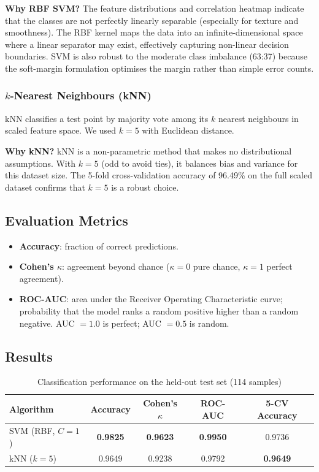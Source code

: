 \documentclass[12pt,a4paper]{article}
\begin{document}
\textbf{Why RBF SVM?}  The feature distributions and correlation heatmap indicate that
the classes are not perfectly linearly separable (especially for texture and smoothness).
The RBF kernel maps the data into an infinite-dimensional space where a linear
separator may exist, effectively capturing non-linear decision boundaries.  SVM is also
robust to the moderate class imbalance (63:37) because the soft-margin formulation
optimises the margin rather than simple error counts.

\subsubsection{$k$-Nearest Neighbours (kNN)}
kNN classifies a test point by majority vote among its $k$ nearest neighbours in
scaled feature space.  We used $k{=}5$ with Euclidean distance.

\textbf{Why kNN?}  kNN is a non-parametric method that makes no distributional
assumptions. With $k{=}5$ (odd to avoid ties), it balances bias and variance for
this dataset size.  The 5-fold cross-validation accuracy of 96.49\% on the full
scaled dataset confirms that $k{=}5$ is a robust choice.

\subsection{Evaluation Metrics}

\begin{itemize}[leftmargin=2em]
  \item \textbf{Accuracy}: fraction of correct predictions.
  \item \textbf{Cohen's $\kappa$}: agreement beyond chance
        ($\kappa = 0$ pure chance, $\kappa = 1$ perfect agreement).
  \item \textbf{ROC-AUC}: area under the Receiver Operating Characteristic curve;
        probability that the model ranks a random positive higher than a random
        negative.  AUC $= 1.0$ is perfect; AUC $= 0.5$ is random.
\end{itemize}

\subsection{Results}

\begin{table}[H]
  \centering
  \caption{Classification performance on the held-out test set (114 samples)}
  \label{tab:clf}
  \begin{tabular}{lcccc}
    \toprule
    \textbf{Algorithm} & \textbf{Accuracy} & \textbf{Cohen's $\kappa$} & \textbf{ROC-AUC} & \textbf{5-CV Accuracy} \\
    \midrule
    SVM (RBF, $C{=}1$) & \textbf{0.9825} & \textbf{0.9623} & \textbf{0.9950} & 0.9736 \\
    kNN ($k{=}5$)       & 0.9649          & 0.9238          & 0.9792          & \textbf{0.9649} \\
    \bottomrule
  \end{tabular}
\end{table}
\end{document}
